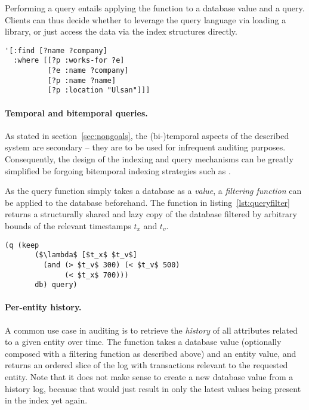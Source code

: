 Performing a query entails applying the  function to a database value and a query. Clients can thus decide whether to leverage the query language via loading a library, or just access the data via the index structures directly.

\begin{lstlisting}[label={lst:example_query},caption="Who from Ulsan is working for whom?"]
'[:find [?name ?company]
  :where [[?p :works-for ?e]
          [?e :name ?company]
          [?p :name ?name]
          [?p :location "Ulsan"]]]
\end{lstlisting}

\paragraph{Temporal and bitemporal queries.}
As stated in section~\ref{sec:nongoals}, the (bi-)temporal aspects of the described system are secondary -- they are to be used for infrequent auditing purposes. Consequently, the design of the indexing and query mechanisms can be greatly simplified be forgoing bitemporal indexing strategies such as \cite{nascimento1995ivtt}.

As the query function simply takes a database as a \emph{value}, a \emph{filtering function} can be applied to the database beforehand. The  function in listing~\ref{lst:queryfilter} returns a structurally shared and lazy copy of the database filtered by arbitrary bounds of the relevant timestamps $t_x$ and $t_v$.

\begin{lstlisting}[label={lst:queryfilter},caption=Applying a temporal filter before querying,morekeywords={keep,q,<,>}]
  (q (keep
       ($\lambda$ [$t_x$ $t_v$]
         (and (> $t_v$ 300) (< $t_v$ 500)
              (< $t_x$ 700)))
       db) query)
  \end{lstlisting}


\paragraph{Per-entity history.} A common use case in auditing is to retrieve the \emph{history} of all attributes related to a given entity over time. The  function takes a database value (optionally composed with a filtering function as described above) and an entity value, and returns an ordered slice of the log with transactions relevant to the requested entity. Note that it does not make sense to create a new database value from a history log, because that would just result in only the latest values being present in the index yet again.


